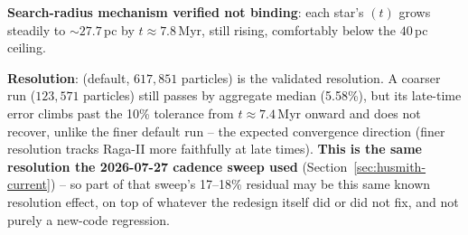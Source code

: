 \textbf{Search-radius mechanism verified not binding}: each star's
$(t)$ grows steadily to $\sim\!27.7\,$pc by
$t\approx7.8\,$Myr, still rising, comfortably below the $40\,$pc
ceiling.

\textbf{Resolution}:  (default, $617{,}851$ particles)
is the validated resolution. A coarser  run
($123{,}571$ particles) still passes by aggregate median (5.58\%), but
its late-time error climbs past the 10\% tolerance from
$t\approx7.4\,$Myr onward and does not recover, unlike the finer
default run -- the expected convergence direction (finer resolution
tracks Raga-II more faithfully at late times). \textbf{This is the same
 resolution the 2026-07-27 cadence sweep used}
(Section~\ref{sec:husmith-current}) -- so part of that sweep's
17--18\% residual may be this same known resolution effect, on top of
whatever the redesign itself did or did not fix, and not purely a
new-code regression.
